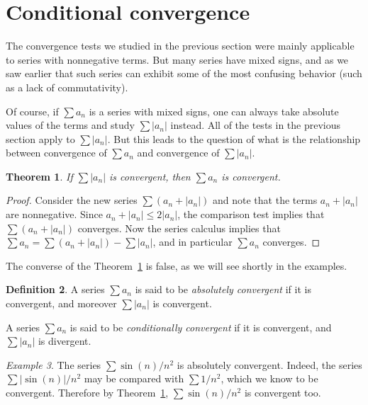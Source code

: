 \documentclass[11pt,oneside]{amsbook}
\theoremstyle{definition}
\theoremstyle{plain}
\newtheorem{theorem}{Theorem}[section]
\theoremstyle{definition}
\newtheorem{definition}[theorem]{Definition}
\theoremstyle{remark}
\newtheorem{example}[theorem]{Example}
\numberwithin{equation}{section}
\numberwithin{figure}{section}
\begin{document}



\newpage
\section{Conditional convergence}

The convergence tests we studied in the previous section were mainly applicable to series with nonnegative terms. But many series have mixed signs, and as we saw earlier that such series can exhibit some of the most confusing behavior (such as a lack of commutativity).

Of course, if $\sum a_n$ is a series with mixed signs, one can always take absolute values of the terms and study $\sum|a_n|$ instead. All of the tests in the previous section apply to $\sum|a_n|$. But this leads to the question of what is the relationship between convergence of $\sum a_n$ and convergence of $\sum|a_n|$.

\begin{theorem}
  \label{thm:absolute}
  If $\sum|a_n|$ is convergent, then $\sum a_n$ is convergent.
\end{theorem}

\begin{proof}
  Consider the new series $\sum(a_n+|a_n|)$ and note that the terms $a_n+|a_n|$ are nonnegative. Since $a_n+|a_n|\leq2|a_n|$, the comparison test implies that $\sum(a_n+|a_n|)$ converges. Now the series calculus implies that $\sum a_n=\sum(a_n+|a_n|)-\sum|a_n|$, and in particular $\sum a_n$ converges.
\end{proof}

The converse of the Theorem~\ref{thm:absolute} is false, as we will see shortly in the examples.

\begin{definition}
  A series $\sum a_n$ is said to be \emph{absolutely convergent} if it is convergent, and moreover $\sum|a_n|$ is convergent.

  A series $\sum a_n$ is said to be \emph{conditionally convergent} if it is convergent, and $\sum|a_n|$ is divergent.
\end{definition}

\begin{example}
  The series $\sum\sin(n)/n^2$ is absolutely convergent. Indeed, the series $\sum|\sin(n)|/n^2$ may be compared with $\sum 1/n^2$, which we know to be convergent. Therefore by Theorem~\ref{thm:absolute}, $\sum\sin(n)/n^2$ is convergent too.
\end{example}
\end{document}
